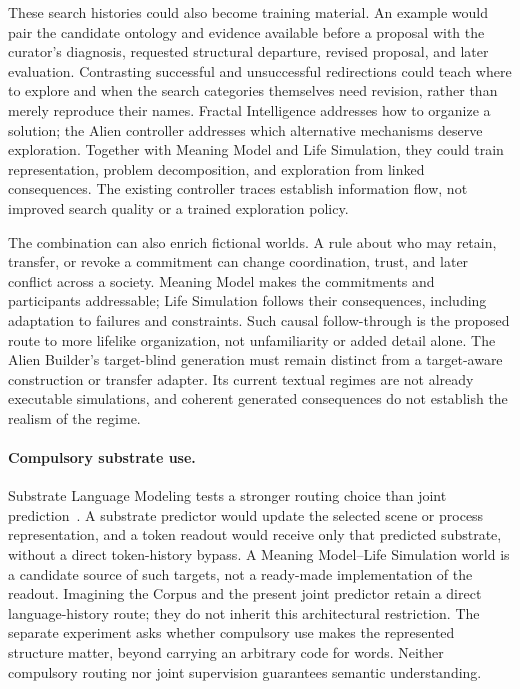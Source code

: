 \documentclass[10pt]{article}
\begin{document}
These search histories could also become training material. An example would
pair the candidate ontology and evidence available before a proposal with the
curator's diagnosis, requested structural departure, revised proposal, and
later evaluation. Contrasting successful and unsuccessful redirections could
teach where to explore and when the search categories themselves need revision,
rather than merely reproduce their names. Fractal Intelligence addresses how
to organize a solution; the Alien controller addresses which alternative
mechanisms deserve exploration. Together with Meaning Model and Life
Simulation, they could train representation, problem decomposition, and
exploration from linked consequences. The existing controller traces establish
information flow, not improved search quality or a trained exploration policy.

The combination can also enrich fictional worlds. A rule about who may retain,
transfer, or revoke a commitment can change coordination, trust, and later
conflict across a society. Meaning Model makes the commitments and participants
addressable; Life Simulation follows their consequences, including adaptation
to failures and constraints. Such causal follow-through is the proposed route
to more lifelike organization, not unfamiliarity or added detail alone.
The Alien Builder's target-blind generation must remain distinct from a
target-aware construction or transfer adapter. Its current textual regimes
are not already executable simulations, and coherent generated consequences
do not establish the realism of the regime.

\paragraph{Compulsory substrate use.}
Substrate Language Modeling tests a stronger routing choice than joint
prediction~\cite{westerbergSTLM2026}. A substrate predictor would update the
selected scene or process representation, and a token readout would receive
only that predicted substrate, without a direct token-history bypass. A
Meaning Model--Life Simulation world is a candidate source of such targets,
not a ready-made implementation of the readout. Imagining the Corpus and the
present joint predictor retain a direct language-history route; they do not
inherit this architectural restriction. The separate experiment asks whether
compulsory use makes the represented structure matter, beyond carrying an
arbitrary code for words. Neither compulsory routing nor joint supervision
guarantees semantic understanding.
\end{document}
